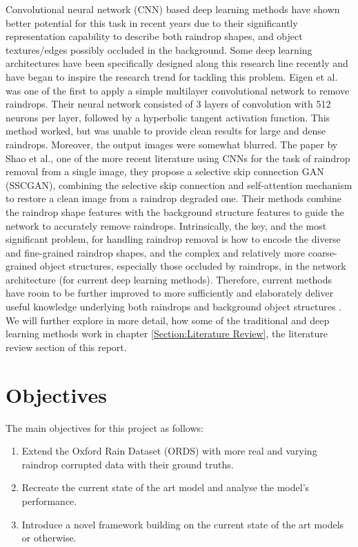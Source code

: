 \documentclass[11pt]{ociamthesis}  %
\begin{document}
Convolutional neural network (CNN) based deep learning methods have shown better potential for this task in recent years due to their significantly representation capability to describe both raindrop shapes, and object textures/edges possibly occluded in the background. Some deep learning architectures have been specifically designed along this research line recently and have began to inspire the research trend for tackling this problem. Eigen et al.\cite{eigen2013restoring} was one of the first to apply a simple multilayer convolutional network to remove raindrops. Their neural network consisted of 3 layers of convolution with 512 neurons per layer, followed by a hyperbolic tangent activation function. This method worked, but was unable to provide clean results for large and dense raindrops. Moreover, the output images were somewhat blurred. The paper by Shao et al.\cite{SHAO2021265}, one of the more recent literature using CNNs for the task of raindrop removal from a single image, they propose a selective skip connection GAN (SSCGAN), combining the selective skip connection and self-attention mechanism to restore a clean image from a raindrop degraded one. Their methods combine the raindrop shape features with the background structure features to guide the network to accurately remove raindrops. Intrinsically, the key, and the most significant problem, for handling raindrop removal is how to encode the diverse and fine-grained raindrop shapes, and the complex and relatively more coarse-grained object structures, especially those occluded by raindrops, in the network architecture (for current deep learning methods). Therefore, current methods have room to be further improved to more sufficiently and elaborately deliver useful knowledge underlying both raindrops and background object structures \cite{SHAO2021265}. We will further explore in more detail, how some of the traditional and deep learning methods work in chapter \ref{Section:Literature Review}, the literature review section of this report.


\section{Objectives}

The main objectives for this project as follows:

\begin{enumerate}
    \item Extend the Oxford Rain Dataset (ORDS) with more real and varying raindrop corrupted data with their ground truths.
    \item Recreate the current state of the art model and analyse the model's performance.
    \item Introduce a novel framework building on the current state of the art models or otherwise.
\end{enumerate}
\end{document}
